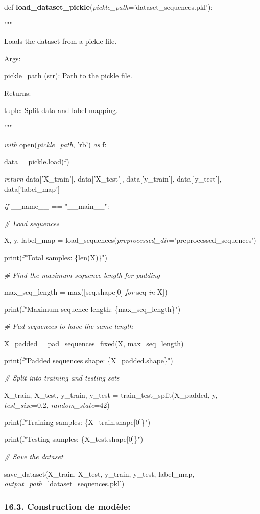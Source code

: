 \documentclass[
]{article}
\begin{document}
def \textbf{load\_dataset\_pickle}(\emph{pickle\_path}='dataset\_sequences.pkl'):

"""

Loads the dataset from a pickle file.

Args:

pickle\_path (str): Path to the pickle file.

Returns:

tuple: Split data and label mapping.

"""

\emph{with} open(\emph{pickle\_path}, 'rb') \emph{as} f:

data = pickle.load(f)

\emph{return} data{[}'X\_train'{]}, data{[}'X\_test'{]}, data{[}'y\_train'{]}, data{[}'y\_test'{]}, data{[}'label\_map'{]}

\emph{if} \_\_name\_\_ == "\_\_main\_\_":

\emph{\# Load sequences}

X, y, label\_map = load\_sequences(\emph{preprocessed\_dir}='preprocessed\_sequences')

print(f"Total samples: \{len(X)\}")

\emph{\# Find the maximum sequence length for padding}

max\_seq\_length = max({[}seq.shape{[}0{]} \emph{for} seq \emph{in} X{]})

print(f"Maximum sequence length: \{max\_seq\_length\}")

\emph{\# Pad sequences to have the same length}

X\_padded = pad\_sequences\_fixed(X, max\_seq\_length)

print(f"Padded sequences shape: \{X\_padded.shape\}")

\emph{\# Split into training and testing sets}

X\_train, X\_test, y\_train, y\_test = train\_test\_split(X\_padded, y, \emph{test\_size}=0.2, \emph{random\_state}=42)

print(f"Training samples: \{X\_train.shape{[}0{]}\}")

print(f"Testing samples: \{X\_test.shape{[}0{]}\}")

\emph{\# Save the dataset}

save\_dataset(X\_train, X\_test, y\_train, y\_test, label\_map, \emph{output\_path}='dataset\_sequences.pkl')

\hypertarget{construction-de-moduxe8le}{%
\subsubsection{16.3. Construction de modèle:}\label{construction-de-moduxe8le}}
\end{document}
